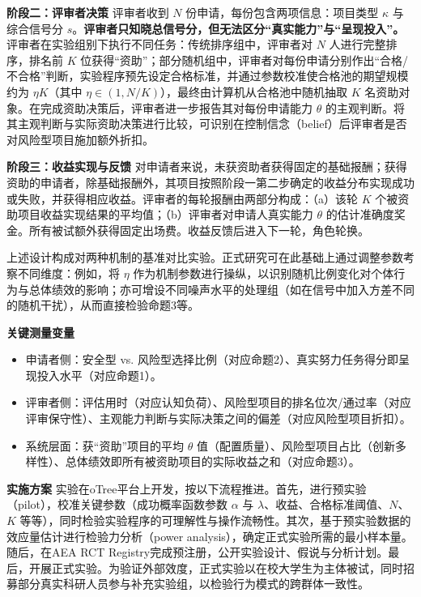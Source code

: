 \noindent\textbf{阶段二：评审者决策} \quad 评审者收到 $N$ 份申请，每份包含两项信息：项目类型 $\kappa$ 与综合信号分 $s$。\textbf{评审者只知晓总信号分，但无法区分“真实能力”与“呈现投入”。}评审者在实验组别下执行不同任务：传统排序组中，评审者对 $N$ 人进行完整排序，排名前 $K$ 位获得“资助”；部分随机组中，评审者对每份申请分别作出“合格/不合格”判断，实验程序预先设定合格标准，并通过参数校准使合格池的期望规模约为 $\eta K$（其中 $\eta \in (1, N/K)$），最终由计算机从合格池中随机抽取 $K$ 名资助对象。在完成资助决策后，评审者进一步报告其对每份申请能力 $\theta$ 的主观判断。将其主观判断与实际资助决策进行比较，可识别在控制信念（belief）后评审者是否对风险型项目施加额外折扣。

\noindent\textbf{阶段三：收益实现与反馈} \quad 对申请者来说，未获资助者获得固定的基础报酬；获得资助的申请者，除基础报酬外，其项目按照阶段一第二步确定的收益分布实现成功或失败，并获得相应收益。评审者的每轮报酬由两部分构成：（a）该轮 $K$ 个被资助项目收益实现结果的平均值；（b）评审者对申请人真实能力 $\theta$ 的估计准确度奖金。所有被试额外获得固定出场费。收益反馈后进入下一轮，角色轮换。

上述设计构成对两种机制的基准对比实验。正式研究可在此基础上通过调整参数考察不同维度：例如，将 $\eta$ 作为机制参数进行操纵，以识别随机比例变化对个体行为与总体绩效的影响；亦可增设不同噪声水平的处理组（如在信号中加入方差不同的随机干扰），从而直接检验命题3等。

\noindent\textbf{关键测量变量} \quad 
\begin{itemize}
    \item 申请者侧：安全型 vs. 风险型选择比例（对应命题2）、真实努力任务得分即呈现投入水平（对应命题1）。
    \item 评审者侧：评估用时（对应认知负荷）、风险型项目的排名位次/通过率（对应评审保守性）、主观能力判断与实际决策之间的偏差（对应风险型项目折扣）。
    \item 系统层面：获“资助”项目的平均 $\theta$ 值（配置质量）、风险型项目占比（创新多样性）、总体绩效即所有被资助项目的实际收益之和（对应命题3）。
\end{itemize}

\noindent\textbf{实施方案} \quad 实验在oTree平台上开发，按以下流程推进。首先，进行预实验（pilot），校准关键参数（成功概率函数参数 $\alpha$ 与 $\lambda$、收益、合格标准阈值、$N$、$K$ 等等），同时检验实验程序的可理解性与操作流畅性。其次，基于预实验数据的效应量估计进行检验力分析（power analysis），确定正式实验所需的最小样本量。随后，在AEA RCT Registry完成预注册，公开实验设计、假说与分析计划。最后，开展正式实验。为验证外部效度，正式实验以在校大学生为主体被试，同时招募部分真实科研人员参与补充实验组，以检验行为模式的跨群体一致性。

